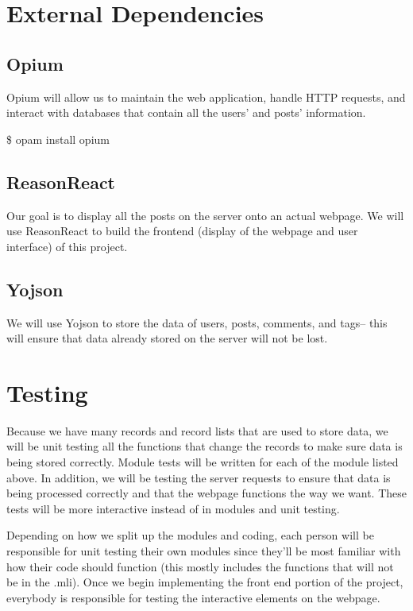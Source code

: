 \documentclass[11pt]{article}
\begin{document}
\section{External Dependencies}

\subsection{Opium}
Opium will allow us to maintain the web application, handle HTTP requests, and interact with databases that contain all the users’ and posts’ information. 

\$ opam install opium

\subsection{ReasonReact}
Our goal is to display all the posts on the server onto an actual webpage. We will use ReasonReact to build the frontend (display of the webpage and user interface) of this project.

\subsection{Yojson}
We will use Yojson to store the data of users, posts, comments, and tags-- this will ensure that data already stored on the server will not be lost. 

\section{Testing}

Because we have many records and record lists that are used to store data, we will be unit testing all the functions that change the records to make sure data is being stored correctly. Module tests will be written for each of the module listed above. In addition, we will be testing the server requests to ensure that data is being processed correctly and that the webpage functions the way we want. These tests will be more interactive instead of in modules and unit testing. 

Depending on how we split up the modules and coding, each person will be responsible for unit testing their own modules since they’ll be most familiar with how their code should function (this mostly includes the functions that will not be in the .mli). Once we begin implementing the front end portion of the project, everybody is responsible for testing the interactive elements on the webpage. 
\end{document}
